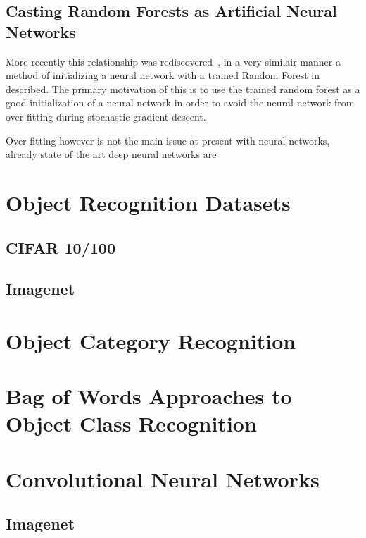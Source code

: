 \documentclass[thesis]{subfiles}
\begin{document}
\subsection{Casting Random Forests as Artificial Neural Networks}
More recently this relationship was rediscovered~\cite{Welbl2014casting}, in a very similair manner a method of initializing a neural network with a trained Random Forest in described. The primary motivation of this is to use the trained random forest as a good initialization of a neural network in order to avoid the neural network from over-fitting during stochastic gradient descent.


Over-fitting however is not the main issue at present with neural networks, already state of the art deep neural networks are 


\section{Object Recognition Datasets}
\subsection{CIFAR 10/100}
\subsection{Imagenet}

\section{Object Category Recognition}
\section[Bag of Words]{Bag of Words Approaches to Object Class Recognition}

\section{Convolutional Neural Networks}
\subsection{Imagenet}
\end{document}
